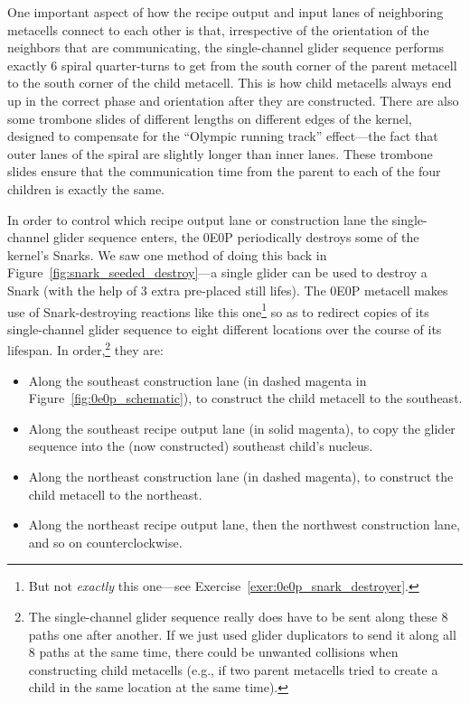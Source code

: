 One important aspect of how the recipe output and input lanes of neighboring metacells connect to each other is that, irrespective of the orientation of the neighbors that are communicating, the single-channel glider sequence performs exactly 6 spiral quarter-turns to get from the south corner of the parent metacell to the south corner of the child metacell. This is how child metacells always end up in the correct phase and orientation after they are constructed. There are also some trombone slides of different lengths on different edges of the kernel, designed to compensate for the ``Olympic running track'' effect---the fact that outer lanes of the spiral are slightly longer than inner lanes. These trombone slides ensure that the communication time from the parent to each of the four children is exactly the same.

In order to control which recipe output lane or construction lane the single-channel glider sequence enters, the 0E0P periodically destroys some of the kernel's Snarks. We saw one method of doing this back in Figure~\ref{fig:snark_seeded_destroy}---a single glider can be used to destroy a Snark (with the help of 3 extra pre-placed still lifes). The 0E0P metacell makes use of Snark-destroying reactions like this one\footnote{But not \emph{exactly} this one---see Exercise~\ref{exer:0e0p_snark_destroyer}.} so as to redirect copies of its single-channel glider sequence to eight different locations over the course of its lifespan. In order,\footnote{The single-channel glider sequence really does have to be sent along these $8$ paths one after another. If we just used glider duplicators to send it along all $8$ paths at the same time, there could be unwanted collisions when constructing child metacells (e.g., if two parent metacells tried to create a child in the same location at the same time).} they are:\smallskip

\begin{itemize}
	\item[1)] Along the southeast construction lane (in dashed magenta in Figure~\ref{fig:0e0p_schematic}), to construct the child metacell to the southeast.\smallskip
	
	\item[2)] Along the southeast recipe output lane (in solid magenta), to copy the glider sequence into the (now constructed) southeast child's nucleus.\smallskip
	
	\item[3)] Along the northeast construction lane (in dashed magenta), to construct the child metacell to the northeast.\smallskip
	
	\item[4) -- 8)] Along the northeast recipe output lane, then the northwest construction lane, and so on counterclockwise.
\end{itemize}


